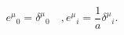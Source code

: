 \begin{equation}\label{eq:killinggauge}
  e^\mu{}_0 =\delta^\mu{}_0 \quad ,
  e^\mu{}_i=\frac{1}{a}\delta^\mu{}_i.
\end{equation}

